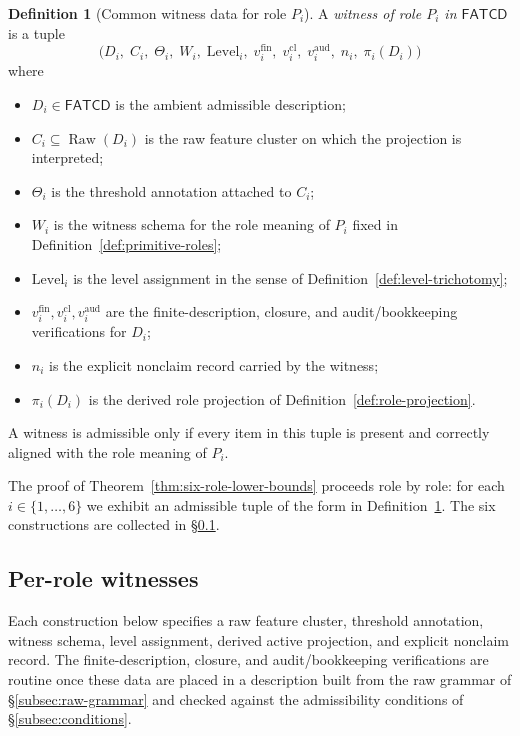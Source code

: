 \documentclass[11pt]{article}
\theoremstyle{definition}
\newtheorem{definition}[theorem]{Definition}
\newcommand{\FATCD}{\ensuremath{\mathsf{FATCD}}}
\newcommand{\Raw}[1]{\ensuremath{\operatorname{Raw}\!\left(#1\right)}}
\begin{document}
\begin{definition}[Common witness data for role \(P_i\)]\label{def:common-witness-data}
A \emph{witness of role \(P_i\) in \FATCD{}} is a tuple
\[
\bigl(D_i,\; C_i,\; \Theta_i,\; W_i,\; \mathrm{Level}_i,\;
v_i^{\mathrm{fin}},\; v_i^{\mathrm{cl}},\; v_i^{\mathrm{aud}},\;
n_i,\; \pi_i(D_i)\bigr)
\]
where
\begin{itemize}[topsep=2pt,itemsep=1pt]
  \item \(D_i \in \FATCD{}\) is the ambient admissible description;
  \item \(C_i \subseteq \Raw{D_i}\) is the raw feature cluster on which
    the projection is interpreted;
  \item \(\Theta_i\) is the threshold annotation attached to \(C_i\);
  \item \(W_i\) is the witness schema for the role meaning of \(P_i\)
    fixed in Definition~\ref{def:primitive-roles};
  \item \(\mathrm{Level}_i\) is the level assignment in the sense of
    Definition~\ref{def:level-trichotomy};
  \item \(v_i^{\mathrm{fin}}, v_i^{\mathrm{cl}}, v_i^{\mathrm{aud}}\) are
    the finite-description, closure, and audit/bookkeeping verifications
    for \(D_i\);
  \item \(n_i\) is the explicit nonclaim record carried by the witness;
  \item \(\pi_i(D_i)\) is the derived role projection of
    Definition~\ref{def:role-projection}.
\end{itemize}
A witness is admissible only if every item in this tuple is present and
correctly aligned with the role meaning of \(P_i\).
\end{definition}

The proof of Theorem~\ref{thm:six-role-lower-bounds} proceeds role by
role: for each \(i \in \{1,\ldots,6\}\) we exhibit an admissible
tuple of the form in Definition~\ref{def:common-witness-data}. The
six constructions are collected in
\S\ref{subsec:per-role-witnesses}.

\subsection{Per-role witnesses}\label{subsec:per-role-witnesses}

Each construction below specifies a raw feature cluster, threshold
annotation, witness schema, level assignment, derived active
projection, and explicit nonclaim record. The finite-description,
closure, and audit/bookkeeping verifications are routine once these
data are placed in a description built from the raw grammar of
\S\ref{subsec:raw-grammar} and checked against the admissibility
conditions of \S\ref{subsec:conditions}.
\end{document}
